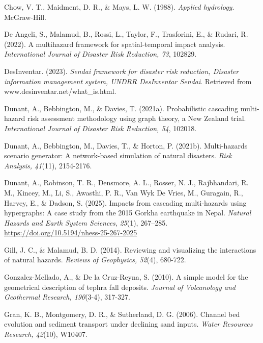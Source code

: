 \documentclass[12pt, a4paper]{article}
\begin{document}

\begin{thebibliography}{}

Chow, V. T., Maidment, D. R., \& Mays, L. W. (1988). \textit{Applied hydrology}. McGraw-Hill.

De Angeli, S., Malamud, B., Rossi, L., Taylor, F., Trasforini, E., \& Rudari, R. (2022). A multihazard framework for spatial-temporal impact analysis. \textit{International Journal of Disaster Risk Reduction, 73}, 102829.

DesInventar. (2023). \textit{Sendai framework for disaster risk reduction, Disaster information management system, UNDRR DesInventar Sendai}. Retrieved from www.desinventar.net/what\_is.html.

Dunant, A., Bebbington, M., \& Davies, T. (2021a). Probabilistic cascading multi-hazard risk assessment methodology using graph theory, a New Zealand trial. \textit{International Journal of Disaster Risk Reduction, 54}, 102018.

Dunant, A., Bebbington, M., Davies, T., & Horton, P. (2021b). Multi-hazards scenario generator: A network-based simulation of natural disasters. \textit{Risk Analysis, 41}(11), 2154-2176.

Dunant, A., Robinson, T. R., Densmore, A. L., Rosser, N. J., Rajbhandari, R. M., Kincey, M., Li, S., Awasthi, P. R., Van Wyk De Vries, M., Guragain, R., Harvey, E., \& Dadson, S. (2025). Impacts from cascading multi-hazards using hypergraphs: A case study from the 2015 Gorkha earthquake in Nepal. \textit{Natural Hazards and Earth System Sciences}, \textit{25}(1), 267–285. \href{https://doi.org/10.5194/nhess-25-267-2025}{https://doi.org/10.5194/nhess-25-267-2025} 

Gill, J. C., \& Malamud, B. D. (2014). Reviewing and visualizing the interactions of natural hazards. \textit{Reviews of Geophysics, 52}(4), 680-722.

Gonzalez-Mellado, A., \& De la Cruz-Reyna, S. (2010). A simple model for the geometrical description of tephra fall deposits. \textit{Journal of Volcanology and Geothermal Research, 190}(3-4), 317-327.

Gran, K. B., Montgomery, D. R., \& Sutherland, D. G. (2006). Channel bed evolution and sediment transport under declining sand inputs. \textit{Water Resources Research, 42}(10), W10407.


\end{thebibliography}
\end{document}
